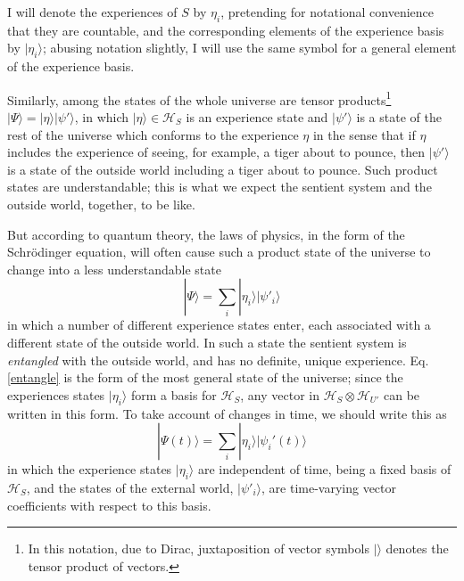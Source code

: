 \documentclass[12pt,a4paper,reqno]{article}
\renewcommand{\(}{\left(}
\renewcommand{\)}{\right)}
\renewcommand{\H}{\mathcal{H}}
\newcommand{\<}{\langle}
\renewcommand{\>}{\rangle}
\newcommand{\be}{\begin{equation}}
\newcommand{\ee}{\end{equation}}
\theoremstyle{plain} %
\begin{document}
I will denote the experiences of $S$ by $\eta_i$, pretending for notational convenience that they are countable, and the corresponding elements of the experience basis by $|\eta_i\>$; abusing notation slightly, I will use the same symbol for a general element of the experience basis. 

Similarly, among the states of the whole universe are tensor products\footnote{In this notation, due to Dirac, juxtaposition of vector symbols $|\>$ denotes the tensor product of vectors.}  $|\Psi\> = |\eta\>|\psi'\>$, in which $|\eta\>\in\H_S$ is an experience state and $|\psi'\>$ is a state of the rest of the universe which conforms to the experience $\eta$ in the sense that if $\eta$ includes the experience of seeing, for example, a tiger about to pounce, then $|\psi'\>$ is a state of the outside world including a tiger about to pounce. Such product states are understandable; this is what we expect the sentient system and the outside world, together, to be like. 

But according to quantum theory, the laws of physics, in the form of the Schr\"odinger equation, will often cause such a product state of the universe to change into a less understandable state
\be\label{entangle}
|\Psi\> = \sum_i |\eta_i\>|\psi'_i\>
\ee
in which a number of different experience states enter, each associated with a different state of the outside world. In such a state the sentient system is \emph{entangled} with the outside world, and has no definite, unique experience. Eq. \eqref{entangle} is the form of the most general state of the universe; since the experiences states $|\eta_i\>$ form a basis for $\H_S$, any vector in $\H_S \otimes \H_{U'}$ can be written in this form. To take account of changes in time, we should write this as
\be\label{universe}
|\Psi(t)\> = \sum_i|\eta_i\>|\psi_i'(t)\>
\ee
in which the experience states $|\eta_i\>$ are independent of time, being a fixed basis of $\H_S$, and the states of the external world, $|\psi'_i\>$, are time-varying vector coefficients with respect to this basis.
\end{document}

